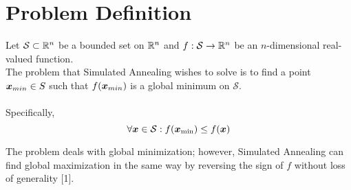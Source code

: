 \section{Problem Definition}
\label{sec:prob}

Let $\mathcal{S}\subset\mathbb{R}^n$ be a bounded set on $\mathbb{R}^n$ and $f:\mathcal{S}\to\mathbb{R}^n$ be an $n$-dimensional real-valued function. \\
The problem that Simulated Annealing wishes to solve is to find a point $\boldsymbol{x}_{min} \in S$ such that $f(\boldsymbol{x}_{min})$ is a global minimum on 
$\mathcal{S}$. \\
\\
Specifically, 
\begin{equation}
    \forall \boldsymbol{x} \in \mathcal{S} : f(\boldsymbol{x}_{\min}) \leq f(\boldsymbol{x})
    \label{eq:min-def}
\end{equation}

The problem deals with global minimization; however, Simulated Annealing can find global maximization in the same way 
by reversing the sign of $f$ without loss of generality [1].
